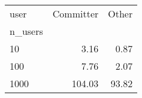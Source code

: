 \begin{tabular}{lrr}
\toprule
user & Committer & Other \\
n_users &  &  \\
\midrule
10 & 3.16 & 0.87 \\
100 & 7.76 & 2.07 \\
1000 & 104.03 & 93.82 \\
\bottomrule
\end{tabular}

